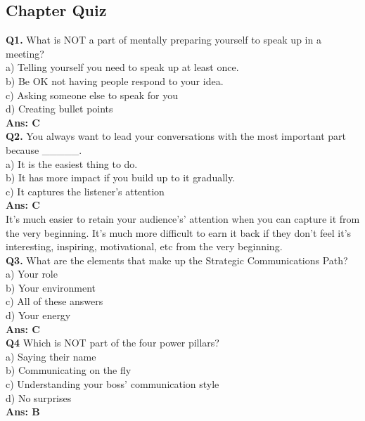 \documentclass[12pt]{article}
\begin{document}
\subsection{Chapter Quiz}
\textbf{Q1.} What is NOT a part of mentally preparing yourself to speak up in a meeting?\\
 a) Telling yourself you need to speak up at least once.\\
 b) Be OK not having people respond to your idea.\\
 c) Asking someone else to speak for you\\
 d) Creating bullet points\\
\textbf{Ans: C}\\
\textbf{Q2.} You always want to lead your conversations with the most important part because \_\_\_\_\_.\\
a) It is the easiest thing to do.\\
b) It has more impact if you build up to it gradually.\\
c) It captures the listener's attention\\
\textbf{Ans: C}\\
It's much easier to retain your audience's' attention when you can capture it from the very beginning. It's much more difficult to earn it back if they don't feel it's interesting, inspiring, motivational, etc from the very beginning.\\
\textbf{Q3.} What are the elements that make up the Strategic Communications Path?\\
a) Your role\\
b) Your environment \\
c) All of these answers\\
d) Your energy\\
\textbf{Ans: C}\\
\textbf{Q4} Which is NOT part of the four power pillars?\\
a) Saying their name \\
b) Communicating on the fly\\
c) Understanding your boss' communication style\\
d) No surprises\\
\textbf{Ans: B}\\


\end{document}
